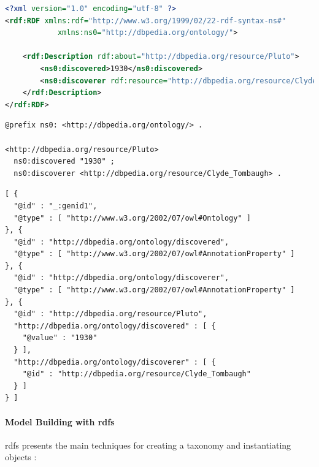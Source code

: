                 \begin{lstlisting}[language=XML, caption=Example of RDF Serialization in RDF/XML, label={lst:rdf-xml}]
<?xml version="1.0" encoding="utf-8" ?>
<rdf:RDF xmlns:rdf="http://www.w3.org/1999/02/22-rdf-syntax-ns#"
            xmlns:ns0="http://dbpedia.org/ontology/">

    <rdf:Description rdf:about="http://dbpedia.org/resource/Pluto">
        <ns0:discovered>1930</ns0:discovered>
        <ns0:discoverer rdf:resource="http://dbpedia.org/resource/Clyde_Tombaugh"/>
    </rdf:Description>
</rdf:RDF>
                \end{lstlisting}

                \begin{lstlisting}[caption=Example of RDF Serialization in Turtle, label={lst:rdf-turtle}]
@prefix ns0: <http://dbpedia.org/ontology/> .

<http://dbpedia.org/resource/Pluto>
  ns0:discovered "1930" ;
  ns0:discoverer <http://dbpedia.org/resource/Clyde_Tombaugh> .
                \end{lstlisting}

                \begin{lstlisting}[caption=Example of RDF Serialization in JSON-LD, label={lst:rdf-json-ld}]
[ {
  "@id" : "_:genid1",
  "@type" : [ "http://www.w3.org/2002/07/owl#Ontology" ]
}, {
  "@id" : "http://dbpedia.org/ontology/discovered",
  "@type" : [ "http://www.w3.org/2002/07/owl#AnnotationProperty" ]
}, {
  "@id" : "http://dbpedia.org/ontology/discoverer",
  "@type" : [ "http://www.w3.org/2002/07/owl#AnnotationProperty" ]
}, {
  "@id" : "http://dbpedia.org/resource/Pluto",
  "http://dbpedia.org/ontology/discovered" : [ {
    "@value" : "1930"
  } ],
  "http://dbpedia.org/ontology/discoverer" : [ {
    "@id" : "http://dbpedia.org/resource/Clyde_Tombaugh"
  } ]
} ]
                \end{lstlisting}

                
        
        
            \paragraph{Model Building with \acrshort{rdfs}}
            \acrfull{rdfs} presents the main techniques for creating a taxonomy and instantiating objects \cite{spelten2023simulation} : 


